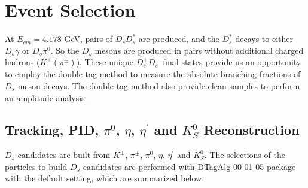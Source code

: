 \section{Event Selection}
\label{ST-selection}
At $E_{cm} = 4.178$ GeV, pairs of $D_{s}D_{s}^{*}$ are produced,  and the $D_{s}^{*}$ decays to either $D_{s}\gamma$ or $D_{s}\pi^{0}$.
So the $D_{s}$ mesons are produced in pairs without additional charged hadrons ($K^{\pm}(\pi^{\pm})$).
These unique $D_{s}^{+}D_{s}^{-}$ final states provide us an opportunity to employ the double tag method to measure the absolute branching fractions of $D_{s}$ meson decays.
The double tag method also provide clean samples to perform an amplitude analysis.


\subsection{Tracking, PID, $\pi^{0}$, $\eta$, $\eta^{'}$ and $K_{S}^{0}$ Reconstruction }
$D_{s}$ candidates are built from $K^{\pm}$, $\pi^{\pm}$, $\pi^{0}$, $\eta$, $\eta^{'}$ and $K_{S}^{0}$. The selections of the particles to build $D_{s}$ candidates are performed with DTagAlg-00-01-05 package with the default setting, which are summarized below.

